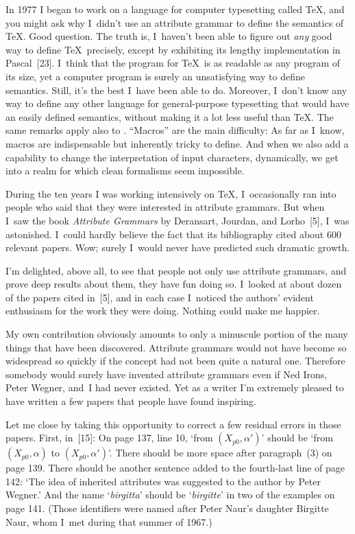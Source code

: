 In 1977 I began to work on a language for computer typesetting called
\TeX, and you might ask why I~didn't use an attribute grammar to
define the semantics of \TeX. Good question. The truth is, I~haven't
been able to figure out {\it any\/}
 good way to define \TeX\ precisely, except
by exhibiting its lengthy implementation in Pascal~[23].
I~think that the program for \TeX\ is as readable as any program of
its size, yet 
a computer program 
 is surely an unsatisfying way to define semantics.
Still, it's the best I~have been
 able to do. Moreover, I~don't know any way
to define any other language for general-purpose typesetting that
would have an easily defined semantics, without making it a lot less
useful than \TeX. 
The same remarks apply also to \MF. ``Macros'' are the main
difficulty:
As far as I~know, macros are indispensable but inherently tricky to
define. And when we also add a capability to change the interpretation
of input characters, dynamically, we get into a realm  for which
clean formalisms seem impossible.

During the ten years I was working intensively on \TeX, I~occasionally
ran into people who said that they were interested in attribute grammars.
But when I~saw the book
{\sl Attribute Grammars\/} by Deransart, Jourdan, and Lorho~[5],
I~was astonished. I~could hardly believe the fact that its
bibliography cited about 600 relevant papers. Wow; surely I~would never
have predicted such dramatic growth.

I'm delighted, above all, to see that people not only use attribute
grammars, 
and prove deep results about them,
they have fun doing so. I~looked at about dozen of the
papers cited in~[5],
and in each case I~noticed the authors' evident enthusiasm for the
work they were doing. Nothing could make me happier.

My own contribution obviously amounts to only  a minuscule portion of
the many things that have been discovered. Attribute grammars would
not have become so widespread so quickly if the concept had not been
quite a natural one. Therefore somebody would surely have invented
attribute grammars even if Ned Irons, Peter Wegner, and~I had never
existed. Yet as a writer I'm extremely
pleased to have written a few papers that
people have found inspiring.

Let me close by taking this opportunity to correct a few residual
errors in those papers. First, in~[15]:
On page 137, line 10, `from $(X_{p0},\alpha')$' should be `from
$(X_{p0},\alpha)$ to $(X_{p0},\alpha')$'. There should be more space
after paragraph~(3) on page 139. There should be another sentence
added to the fourth-last line of page 142: `The idea of inherited
attributes was suggested to the author by Peter Wegner.' And the name
`{\it birgitta\/}' should be `{\it birgitte\/}' in two of the examples
on page 141. (Those identifiers were named after Peter Naur's daughter
Birgitte Naur, whom I~met during that summer of 1967.)

